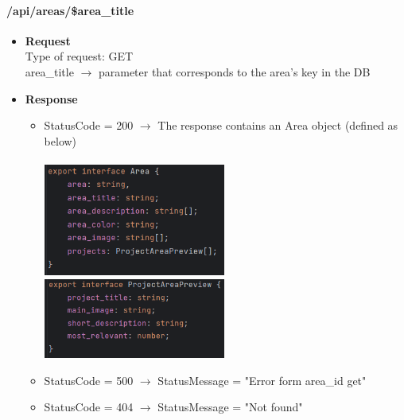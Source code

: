 \documentclass[11pt, letterpaper]{article}
\begin{document}
\paragraph{/api/areas/\$area\_title}
\begin{itemize}
    \item \textbf{Request} \\ Type of request: GET \\ area\_title $\rightarrow$ parameter that corresponds to the area's key in the DB 
    \item \textbf{Response} \begin{itemize}
        \item StatusCode = 200 $\rightarrow$ The response contains an Area object (defined as below) \\ \\
            \includegraphics[width=6cm]{images/API/Area.png} \includegraphics[width=6cm]{images/API/ProjectAreaPreview.png}
        \item StatusCode = 500 $\rightarrow$ StatusMessage = "Error form area\_id get"
        \item StatusCode = 404 $\rightarrow$ StatusMessage = "Not found"
    \end{itemize} 
\end{itemize}
\end{document}
